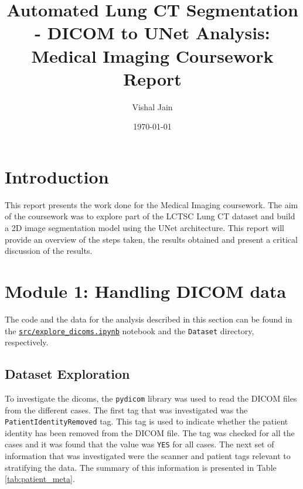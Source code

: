 \documentclass[11pt]{article}
\title{Automated Lung CT Segmentation -  DICOM to UNet Analysis: Medical Imaging Coursework Report}
\author{Vishal Jain}
\date{\today}
\begin{document}
\maketitle

\tableofcontents

\newpage

\section{Introduction}
This report presents the work done for the Medical Imaging coursework. The aim of the coursework was to explore part of the LCTSC Lung CT dataset and build a 2D image segmentation model using the UNet architecture. This report will provide an overview of the steps taken, the results obtained and present a critical discussion of the results.

\section{Module 1: Handling DICOM data}
The code and the data for the analysis described in this section can be found in the \texttt{\url{src/explore_dicoms.ipynb}} notebook and the \texttt{Dataset} directory, respectively.

\subsection{Dataset Exploration}
To investigate the dicoms, the \texttt{pydicom} library was used to read the DICOM files from the different cases. The first tag that was investigated was the \texttt{PatientIdentityRemoved} tag. This tag is used to indicate whether the patient identity has been removed from the DICOM file. The tag was checked for all the cases and it was found that the value was \texttt{YES} for all cases. The next set of information that was investigated were the scanner and patient tags relevant to stratifying the data. The summary of this information is presented in Table \ref{tab:patient_meta}.
\end{document}
